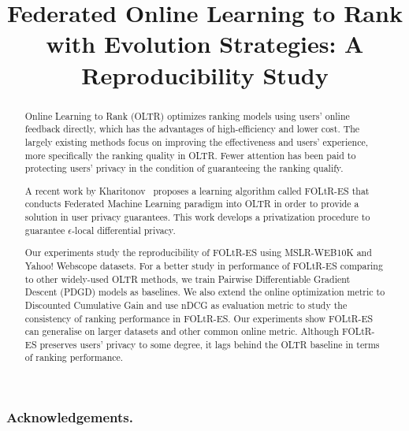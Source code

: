 \documentclass[runningheads]{llncs}
\begin{document}

\title{Federated Online Learning to Rank with Evolution Strategies: A Reproducibility Study}


%



\maketitle

\begin{abstract}
Online Learning to Rank (OLTR) optimizes ranking models using users' online feedback directly, which has the advantages of high-efficiency and lower cost. The largely existing methods focus on improving the effectiveness and users' experience, more specifically the ranking quality in OLTR. Fewer attention has been paid to protecting users' privacy in the condition of guaranteeing the ranking qualify.

A recent work by Kharitonov~\cite{kharitonov2019federated} proposes a learning algorithm called FOLtR-ES that conducts Federated Machine Learning paradigm into OLTR in order to provide a solution in user privacy guarantees. This work develops a privatization procedure to guarantee $\epsilon$-local differential privacy.

Our experiments study the reproducibility of FOLtR-ES using MSLR-WEB10K and Yahoo! Webscope datasets. For a better study in performance of FOLtR-ES comparing to other widely-used OLTR methods, we train Pairwise Differentiable Gradient Descent (PDGD) models as baselines. We also extend the online optimization metric to Discounted Cumulative Gain and use nDCG as evaluation metric to study the consistency of ranking performance in FOLtR-ES. Our experiments show FOLtR-ES can generalise on larger datasets and other common online metric. Although FOLtR-ES preserves users' privacy to some degree, it lags behind the OLTR baseline in terms of ranking performance. 

\end{abstract}












\makeatletter
\renewcommand{\@biblabel}[1]{\hfill #1.}
\makeatother

\subsubsection*{Acknowledgements.}






\end{document}
